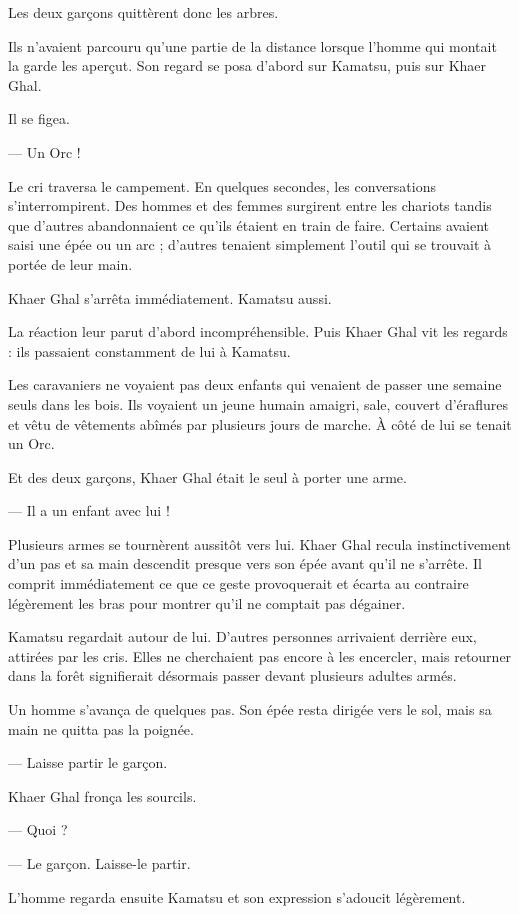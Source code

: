 Les deux garçons quittèrent donc les arbres.

Ils n'avaient parcouru qu'une partie de la distance lorsque l'homme qui montait
la garde les aperçut. Son regard se posa d'abord sur Kamatsu, puis sur Khaer
Ghal.

Il se figea.

— Un Orc !

Le cri traversa le campement. En quelques secondes, les conversations
s'interrompirent. Des hommes et des femmes surgirent entre les chariots tandis
que d'autres abandonnaient ce qu'ils étaient en train de faire. Certains
avaient saisi une épée ou un arc ; d'autres tenaient simplement l'outil qui se
trouvait à portée de leur main.

Khaer Ghal s'arrêta immédiatement. Kamatsu aussi.

La réaction leur parut d'abord incompréhensible. Puis Khaer Ghal vit les
regards : ils passaient constamment de lui à Kamatsu.

Les caravaniers ne voyaient pas deux enfants qui venaient de passer une semaine
seuls dans les bois. Ils voyaient un jeune humain amaigri, sale, couvert
d'éraflures et vêtu de vêtements abîmés par plusieurs jours de marche. À côté
de lui se tenait un Orc.

Et des deux garçons, Khaer Ghal était le seul à porter une arme.

— Il a un enfant avec lui !

Plusieurs armes se tournèrent aussitôt vers lui. Khaer Ghal recula
instinctivement d'un pas et sa main descendit presque vers son épée avant qu'il
ne s'arrête. Il comprit immédiatement ce que ce geste provoquerait et écarta
au contraire légèrement les bras pour montrer qu'il ne comptait pas dégainer.

Kamatsu regardait autour de lui. D'autres personnes arrivaient derrière eux,
attirées par les cris. Elles ne cherchaient pas encore à les encercler, mais
retourner dans la forêt signifierait désormais passer devant plusieurs adultes
armés.

Un homme s'avança de quelques pas. Son épée resta dirigée vers le sol, mais sa
main ne quitta pas la poignée.

— Laisse partir le garçon.

Khaer Ghal fronça les sourcils.

— Quoi ?

— Le garçon. Laisse-le partir.

L'homme regarda ensuite Kamatsu et son expression s'adoucit légèrement.

